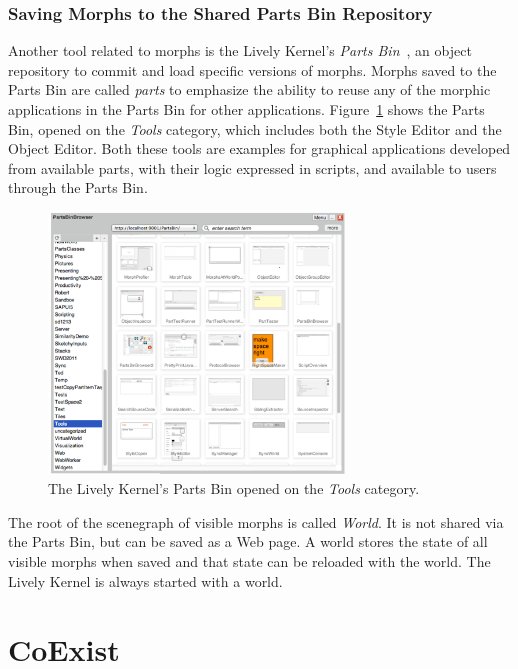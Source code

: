\subsubsection{Saving Morphs to the Shared Parts Bin Repository}

Another tool related to morphs is the Lively Kernel's \emph{Parts Bin}~\cite{Lincke2012LPC}, an object repository to commit and load specific versions of morphs.
Morphs saved to the Parts Bin are called \emph{parts} to emphasize the ability to reuse any of the morphic applications in the Parts Bin for other applications.
Figure~\ref{fig:PartsBin} shows the Parts Bin, opened on the \emph{Tools} category, which includes both the Style Editor and the Object Editor.
Both these tools are examples for graphical applications developed from available parts, with their logic expressed in scripts, and available to users through the Parts Bin.

\begin{figure}[h]
    \centering
    \includegraphics[width=0.7\textwidth]{figures/2_background/3_partsBin.pdf}
    \caption{The Lively Kernel's Parts Bin opened on the \emph{Tools} category.}
    \label{fig:PartsBin}
\end{figure}


The root of the scenegraph of visible morphs is called \emph{World}.
It is not shared via the Parts Bin, but can be saved as a Web page.
A world stores the state of all visible morphs when saved and that state can be reloaded with the world.
The Lively Kernel is always started with a world.

\section{CoExist}

